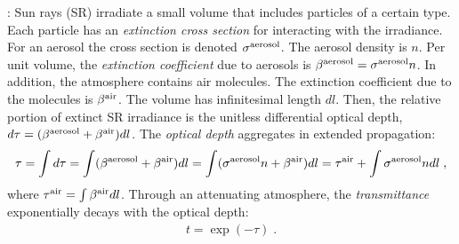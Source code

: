 \documentclass[10pt,letterpaper]{article}
\begin{document}

: Sun rays (SR) irradiate a small volume
that includes particles of a certain type.
Each particle has an {\em extinction cross section} for
interacting with the irradiance. For an aerosol the cross section is denoted $\sigma^{\rm aerosol}$.
The aerosol density is $n$. Per unit volume, the {\em extinction coefficient} due to aerosols is
$\beta^{\rm aerosol}= \sigma^{\rm aerosol} n$. In addition, the atmosphere contains air molecules.
The extinction coefficient due to the molecules is $\beta^{\rm air}$.
The volume has infinitesimal length $dl$. Then, the relative portion
of extinct SR irradiance is the unitless differential optical
  depth, $d\tau= (\beta^{\rm aerosol}+\beta^{\rm air}) dl$.
The {\em optical depth} aggregates in extended propagation:
\begin{align}
  \tau= \int d\tau=\int (\beta^{\rm aerosol}+\beta^{\rm air}) dl
       =\int (\sigma^{\rm aerosol} n +\beta^{\rm air}) dl
       = \tau^{\rm air}+ \int \sigma^{\rm aerosol} n dl \;,
  \label{eq:tau}
\end{align}
where $\tau^{\rm air}=\int \beta^{\rm air} dl$.
Through an attenuating atmosphere, the {\em transmittance} exponentially
decays with the optical depth:
\begin{align}
  t=\exp(-\tau) \;.
  \label{eq:beer-lambert}
\end{align}
\end{document}
